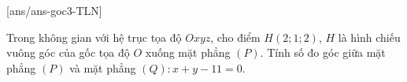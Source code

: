 
[ans/ans-goc3-TLN]
\TNSA
\begin{ex}%
	Trong không gian với hệ trục tọa độ $Oxyz$, cho điểm $H(2;1;2)$, $H$ là hình chiếu vuông góc của gốc tọa độ $O$ xuống mặt phẳng $(P)$. Tính số đo góc giữa mặt phẳng $(P)$ và mặt phẳng $(Q)\colon x+y-11=0$.
\end{ex}



